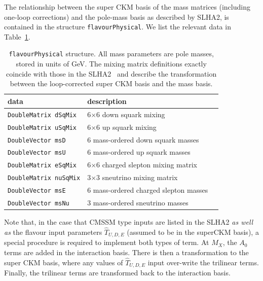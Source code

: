 \documentclass{article}
\def\code#1{\small{\tt #1}\normalsize}
\begin{document}
The relationship between the super CKM basis of the mass matrices (including
one-loop corrections) and the pole-mass basis as described by SLHA2, is
contained in the structure 
\code{flavourPhysical}. We list the relevant data in Table~\ref{tab:flavphys}.
\begin{table}\begin{center}\begin{tabular}{lll} 
data & description \\ \hline
\code{DoubleMatrix dSqMix} & 6$\times$6 down squark mixing \\
\code{DoubleMatrix uSqMix} & 6$\times$6 up squark mixing \\
\code{DoubleVector msD} & 6 mass-ordered down squark masses\\
\code{DoubleVector msU} & 6 mass-ordered up squark masses\\
\code{DoubleMatrix eSqMix} & 6$\times$6 charged slepton mixing matrix \\
\code{DoubleMatrix nuSqMix} & 3$\times$3 sneutrino mixing matrix \\
\code{DoubleVector msE} & 6 mass-ordered charged slepton masses  \\
\code{DoubleVector msNu} & 3 mass-ordered sneutrino masses \\
\end{tabular}\caption{\label{tab:flavphys}\code{flavourPhysical} structure. All mass parameters
  are pole 
  masses, stored in
  units of GeV. The mixing matrix definitions exactly coincide with
  those in the 
SLHA2~\protect\cite{lhacc2} and describe the transformation between the
loop-corrected super CKM basis and the mass basis.}\end{center}\end{table}
Note that, in the case that CMSSM type inputs are listed in the SLHA2 {\em
  as well as} the flavour input parameters $\hat T_{U,D,E}$ (assumed to be in
the superCKM basis), a special procedure is required to implement both types
of term.
At $M_X$, the $A_0$ terms are added in the interaction basis. There is then a
transformation to the super CKM basis, where any values of $\hat T_{U,D,E}$
input over-write the trilinear terms. Finally, the trilinear terms are
transformed back to the interaction basis. 
\end{document}
